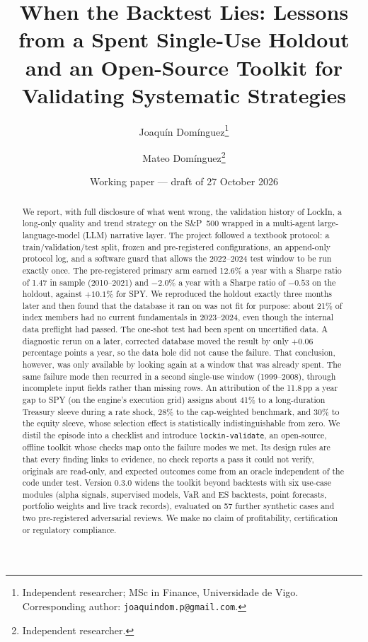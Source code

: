 \documentclass[11pt]{article}
\title{When the Backtest Lies: Lessons from a Spent Single-Use Holdout\\
and an Open-Source Toolkit for Validating Systematic Strategies}
\author{Joaqu\'in Dom\'inguez\thanks{Independent researcher; MSc in Finance, Universidade de Vigo. Corresponding author: \texttt{joaquindom.p@gmail.com}.} \and Mateo Dom\'inguez\thanks{Independent researcher.}}
\date{Working paper --- draft of 27 October 2026}
\begin{document}
\maketitle

\begin{abstract}
\noindent
We report, with full disclosure of what went wrong, the validation history of LockIn, a long-only quality and trend strategy on the S\&P~500 wrapped in a multi-agent large-language-model (LLM) narrative layer. The project followed a textbook protocol: a train/validation/test split, frozen and pre-registered configurations, an append-only protocol log, and a software guard that allows the 2022--2024 test window to be run exactly once. The pre-registered primary arm earned 12.6\% a year with a Sharpe ratio of 1.47 in sample (2010--2021) and $-2.0\%$ a year with a Sharpe ratio of $-0.53$ on the holdout, against $+10.1\%$ for SPY. We reproduced the holdout exactly three months later and then found that the database it ran on was not fit for purpose: about 21\% of index members had no current fundamentals in 2023--2024, even though the internal data preflight had passed. The one-shot test had been spent on uncertified data. A diagnostic rerun on a later, corrected database moved the result by only $+0.06$ percentage points a year, so the data hole did not cause the failure. That conclusion, however, was only available by looking again at a window that was already spent. The same failure mode then recurred in a second single-use window (1999--2008), through incomplete input fields rather than missing rows. An attribution of the 11.8\,pp a year gap to SPY (on the engine's execution grid) assigns about 41\% to a long-duration Treasury sleeve during a rate shock, 28\% to the cap-weighted benchmark, and 30\% to the equity sleeve, whose selection effect is statistically indistinguishable from zero. We distil the episode into a checklist and introduce \texttt{lockin-validate}, an open-source, offline toolkit whose checks map onto the failure modes we met. Its design rules are that every finding links to evidence, no check reports a pass it could not verify, originals are read-only, and expected outcomes come from an oracle independent of the code under test. Version 0.3.0 widens the toolkit beyond backtests with six use-case modules (alpha signals, supervised models, VaR and ES backtests, point forecasts, portfolio weights and live track records), evaluated on 57 further synthetic cases and two pre-registered adversarial reviews. We make no claim of profitability, certification or regulatory compliance.
\end{abstract}
\end{document}
